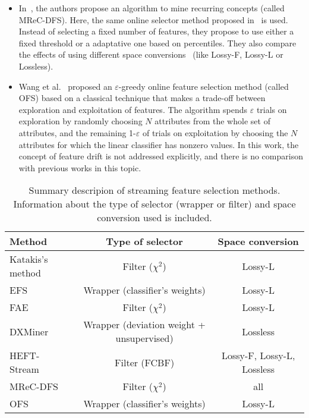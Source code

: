 \documentclass[preprint,12pt]{elsarticle}
\begin{document}
\begin{itemize}
	\item In~\cite{gomes14}, the authors propose an algorithm to mine recurring concepts (called MReC-DFS). Here, the same online selector method proposed in~\cite{kata05} is used. Instead of selecting a fixed number of features, they propose to use either a fixed threshold or a adaptative one based on percentiles. They also compare the effects of using different space conversions~\cite{masud10} (like Lossy-F, Lossy-L or Lossless).
	\item Wang et al.~\cite{wang14} proposed an $\varepsilon$-greedy online feature selection method (called OFS) based on a classical technique that makes a trade-off between exploration and exploitation of features. The algorithm spends $\varepsilon$ trials on exploration by randomly choosing $N$ attributes from the whole set of attributes, and the remaining 1-$\varepsilon$ of trials on exploitation by choosing the $N$ attributes for which the linear classifier has nonzero values. %
In this work, the concept of feature drift is not addressed explicitly, and there is no comparison with previous works in this topic.
\end{itemize}

\begin{table}[!htp]
\renewcommand{\arraystretch}{1.3}
\centering
\scriptsize
\caption{Summary descripion of streaming feature selection methods. Information about the type of selector (wrapper or filter) and space conversion used is included.}
\label{tab:fs}
\begin{tabular}{ lcc }
\toprule
{\bf Method} & {\bf Type of selector} & {\bf Space conversion}\\
\midrule
Katakis's method~\cite{kata05} & Filter ($\chi^2$) & Lossy-L\\
EFS~\cite{carva06} & Wrapper (classifier's weights) & Lossy-L\\
FAE~\cite{wener06} & Filter ($\chi^2$) & Lossy-L\\
DXMiner~\cite{masud10} & Wrapper (deviation weight + unsupervised) & Lossless\\
HEFT-Stream~\cite{nguyen12} & Filter (FCBF) & Lossy-F, Lossy-L, Lossless\\
MReC-DFS~\cite{gomes14} & Filter ($\chi^2$) & all\\
OFS~\cite{wang14} & Wrapper (classifier's weights) & Lossy-L\\
\bottomrule
\end{tabular}
\end{table}
\end{document}
